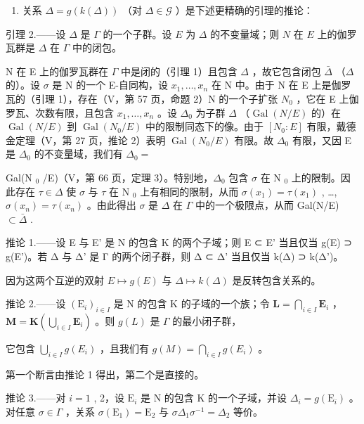 \begin{enumerate}
\def\labelenumi{\Alph{enumi})}
\setcounter{enumi}{1}
\tightlist
\item
  关系 \(\Delta = g(k(\Delta))\) （对 \(\Delta \in \mathcal{G}\) ）是下述更精确的引理的推论：
\end{enumerate}

引理 2.——设 \(\Delta\) 是 \(\Gamma\) 的一个子群。设 \(E\) 为 \(\Delta\) 的不变量域；则 \(N\) 在 \(E\) 上的伽罗瓦群是 \(\Delta\) 在 \(\Gamma\) 中的闭包。

N 在 E 上的伽罗瓦群在 \(\Gamma\) 中是闭的（引理 1）且包含 \(\Delta\) ，故它包含闭包 \(\bar{\Delta}\) （\(\Delta\) 的）。设 \(\sigma\) 是 N 的一个 E-自同构，设 \(x_{1}, \ldots, x_{n}\) 在 N 中。由于 N 在 E 上是伽罗瓦的（引理 1），存在（V，第 57 页，命题 2）N 的一个子扩张 \(N_{0}\) ，它在 E 上伽罗瓦、次数有限，且包含 \(x_{1}, \ldots, x_{n}\) 。设 \(\Delta_{0}\) 为子群 \(\Delta\) （\(\operatorname{Gal}(N/E)\) 的）在 \(\operatorname{Gal}(N/E)\) 到 \(\operatorname{Gal}(N_{0}/E)\) 中的限制同态下的像。由于 \([N_{0}:E]\) 有限，戴德金定理（V，第 27 页，推论 2）表明 \(\operatorname{Gal}(N_{0}/E)\) 有限。故 \(\Delta_{0}\) 有限，又因 E 是 \(\Delta_{0}\) 的不变量域，我们有 \(\Delta_{0}=\)

Gal(N \(_0\) /E)（V，第 66 页，定理 3）。特别地，\(\Delta_0\) 包含 \(\sigma\) 在 N \(_0\) 上的限制。因此存在 \(\tau \in \Delta\) 使 \(\sigma\) 与 \(\tau\) 在 N \(_0\) 上有相同的限制，从而 \(\sigma(x_1) = \tau(x_1)\) , \ldots, \(\sigma(x_n) = \tau(x_n)\) 。由此得出 \(\sigma\) 是 \(\Delta\) 在 \(\Gamma\) 中的一个极限点，从而 Gal(N/E) \(\subset \bar{\Delta}\) .

推论 1.——设 E 与 E' 是 N 的包含 K 的两个子域；则 E ⊂ E' 当且仅当 g(E) ⊃ g(E')。若 Δ 与 Δ' 是 Γ 的两个闭子群，则 Δ ⊂ Δ' 当且仅当 k(Δ) ⊃ k(Δ')。

因为这两个互逆的双射 \(E \mapsto g(E)\) 与 \(\Delta \mapsto k(\Delta)\) 是反转包含关系的。

推论 2.——设 \((\mathrm{E}_i)_{i\in I}\) 是 N 的包含 K 的子域的一个族；令 \(\mathbf{L} = \bigcap_{i\in I}\mathbf{E}_i\) ，\(\mathbf{M} = \mathbf{K}\left(\bigcup_{i\in I}\mathbf{E}_i\right)\) 。则 \(g(L)\) 是 \(\Gamma\) 的最小闭子群，

它包含 \(\bigcup_{i\in I}g(E_i)\) ，且我们有 \(g(M) = \bigcap_{i\in I}g(E_i)\) 。

第一个断言由推论 1 得出，第二个是直接的。

推论 3.——对 \(i=1\) , 2，设 \(\mathrm{E}_{i}\) 是 N 的包含 K 的一个子域，并设 \(\Delta_{i}=g(\mathrm{E}_{i})\) 。对任意 \(\sigma\in\Gamma\) ，关系 \(\sigma(\mathrm{E}_{1})=\mathrm{E}_{2}\) 与 \(\sigma\Delta_{1}\sigma^{-1}=\Delta_{2}\) 等价。

